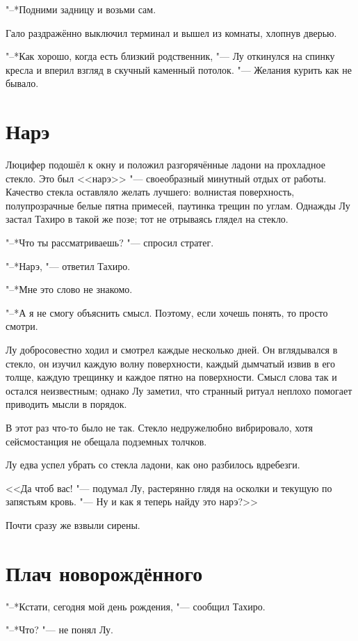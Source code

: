 \documentclass[a4paper,10pt]{book}
\begin{document}
"--*Подними задницу и возьми сам.

Гало раздражённо выключил терминал и вышел из комнаты, хлопнув дверью.

"--*Как хорошо, когда есть близкий родственник, "--- Лу откинулся на спинку кресла и вперил взгляд в скучный каменный потолок. "--- Желания курить как не бывало.

\section{Нарэ}

Люцифер подошёл к окну и положил разгорячённые ладони на прохладное стекло.
Это был <<нарэ>> "--- своеобразный минутный отдых от работы.
Качество стекла оставляло желать лучшего: волнистая поверхность, полупрозрачные белые пятна примесей, паутинка трещин по углам.
Однажды Лу застал Тахиро в такой же позе;
тот не отрываясь глядел на стекло.

"--*Что ты рассматриваешь? "--- спросил стратег.

"--*Нарэ, "--- ответил Тахиро.

"--*Мне это слово не знакомо.

"--*А я не смогу объяснить смысл.
Поэтому, если хочешь понять, то просто смотри.

Лу добросовестно ходил и смотрел каждые несколько дней.
Он вглядывался в стекло, он изучил каждую волну поверхности, каждый дымчатый извив в его толще, каждую трещинку и каждое пятно на поверхности.
Смысл слова так и остался неизвестным;
однако Лу заметил, что странный ритуал неплохо помогает приводить мысли в порядок.

В этот раз что-то было не так.
Стекло недружелюбно вибрировало, хотя сейсмостанция не обещала подземных толчков.

Лу едва успел убрать со стекла ладони, как оно разбилось вдребезги.

<<Да чтоб вас! "--- подумал Лу, растерянно глядя на осколки и текущую по запястьям кровь. "--- Ну и как я теперь найду это нарэ?>>

Почти сразу же взвыли сирены.

\section{Плач новорождённого}

"--*Кстати, сегодня мой день рождения, "--- сообщил Тахиро.

"--*Что? "--- не понял Лу.
\end{document}

